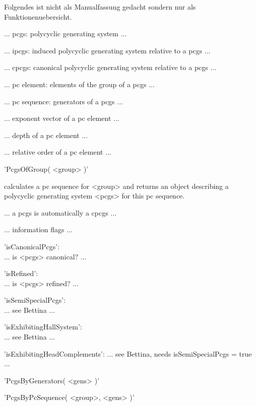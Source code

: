 Folgendes ist nicht als Manualfassung gedacht sondern nur als
Funktionenuebersicht.


... pcgs: polycyclic generating system ...

... ipcgs: induced polycyclic generating system relative to a pcgs ...

... cpcgs: canonical polycyclic generating system relative to a pcgs ...

... pc element: elements of the group of a pcgs ...

... pc sequence: generators of a pcgs ...

... exponent vector of a pc element ...

... depth of a pc element ...

... relative order of a pc element ...


'PcgsOfGroup( <group> )'

calculates a  pc sequence for <group> and  returns an object describing a
polycyclic generating system <pcgs> for this pc sequence.

... a pcgs is automatically a cpcgs ...

... information flags ...

'isCanonicalPcgs': \\
    ... is <pcgs> canonical? ...

'isRefined': \\
    ... is <pcgs> refined? ...

'isSemiSpecialPcgs': \\
    ... see Bettina ...

'isExhibitingHallSystem': \\
    ... see Bettina ...

'isExhibitingHeadComplements':
    ... see Bettina, needs isSemiSpecialPcgs = true ...


'PcgsByGenerators( <gens> )'



'PcgsByPcSequence( <group>, <gens> )'

